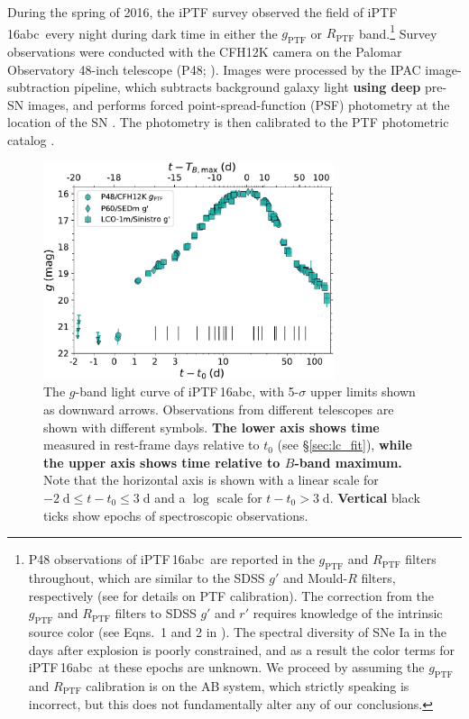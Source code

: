 \documentclass[twocolumn]{aastex61}
\newcommand{\abc}{iPTF\,16abc}
\begin{document}
During the spring of 2016, the iPTF survey observed the field of \abc\ every
night during dark time in either the $g_\mathrm{PTF}$ or $R_\mathrm{PTF}$
band.\footnote{P48 observations of \abc\ are reported in the $g_\mathrm{PTF}$
and $R_\mathrm{PTF}$ filters throughout, which are similar to the SDSS $g'$
and Mould-$R$ filters, respectively (see \citealt{2012PASP..124..854O} for
details on PTF calibration). The correction from the $g_\mathrm{PTF}$ and
$R_\mathrm{PTF}$ filters to SDSS $g'$ and $r'$ requires knowledge of the
intrinsic source color (see Eqns.~1 and 2 in \citealt{2012PASP..124..854O}).
The spectral diversity of SNe Ia in the days after explosion is poorly
constrained, and as a result the color terms for \abc\ at these epochs are
unknown. We proceed by assuming the $g_\mathrm{PTF}$ and $R_\mathrm{PTF}$
calibration is on the AB system, which strictly speaking is incorrect, but
this does not fundamentally alter any of our conclusions.} Survey observations
were conducted with the CFH12K camera \citep{2008SPIE.7014E..4YR} on the
Palomar Observatory 48-inch telescope (P48; \citealt{2009PASP..121.1395L}).
Images were processed by the IPAC image-subtraction pipeline, which subtracts
background galaxy light \textbf{using deep} pre-SN images, and performs forced
point-spread-function (PSF) photometry at the location of the SN
\citep{2017PASP..129a4002M}. The photometry is then calibrated to the PTF
photometric catalog \citep{2012PASP..124..854O}.

\begin{figure}[htb] 
    \centering
    \includegraphics[width=3.35in]{logLC_with_colors.pdf} 
    \caption{
    The $g$-band light curve of \abc, with 5-$\sigma$ upper limits shown as
    downward arrows. Observations from different telescopes are shown with
    different symbols. \textbf{The lower axis shows time} measured in
    rest-frame days relative to $t_0$ (see \S\ref{sec:lc_fit}), \textbf{while
    the upper axis shows time relative to $B$-band maximum.} Note that the
    horizontal axis is shown with a linear scale for $-2 \; \mathrm{d} \le t -
    t_0 \le 3 \; \mathrm{d}$ and a $\log$ scale for $t - t_0 > 3 \;
    \mathrm{d}$. \textbf{Vertical} black ticks show epochs of spectroscopic
    observations. }
% 
    \label{fig:lightcurve} 
\end{figure}
\end{document}
